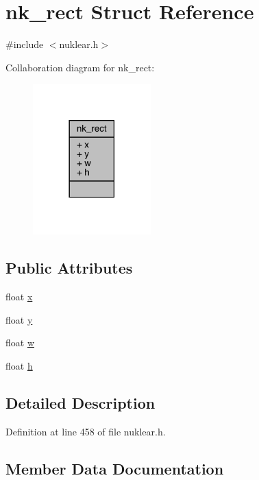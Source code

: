\hypertarget{structnk__rect}{}\section{nk\+\_\+rect Struct Reference}
\label{structnk__rect}


{\ttfamily \#include $<$nuklear.\+h$>$}



Collaboration diagram for nk\+\_\+rect\+:
\nopagebreak
\begin{figure}[H]
\begin{center}
\leavevmode
\includegraphics[width=129pt]{structnk__rect__coll__graph}
\end{center}
\end{figure}
\subsection*{Public Attributes}
\begin{DoxyCompactItemize}
\item 
float \mbox{\hyperlink{structnk__rect_a406b23fbee8afcc3c1a8113c6e4616a1}{x}}
\item 
float \mbox{\hyperlink{structnk__rect_ac26ac69f1770909de805053a8cc94f08}{y}}
\item 
float \mbox{\hyperlink{structnk__rect_af2afe0055fff7694a63a53b8047f6022}{w}}
\item 
float \mbox{\hyperlink{structnk__rect_a1923740134757198bfa473f5513d66b5}{h}}
\end{DoxyCompactItemize}


\subsection{Detailed Description}


Definition at line 458 of file nuklear.\+h.



\subsection{Member Data Documentation}
\mbox{\label{structnk__rect_a1923740134757198bfa473f5513d66b5}} 
